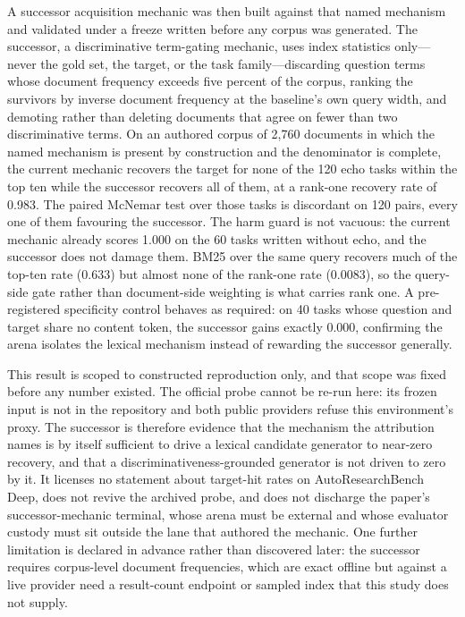 A successor acquisition mechanic was then built against that named mechanism and
validated under a freeze written before any corpus was generated.  The
successor, a discriminative term-gating mechanic, uses index statistics only---never the
gold set, the target, or the task family---discarding question terms whose
document frequency exceeds five percent of the corpus, ranking the survivors by
inverse document frequency at the baseline's own query width, and demoting rather
than deleting documents that agree on fewer than two discriminative terms.  On an
authored corpus of 2,760 documents in which the named mechanism is present by
construction and the denominator is complete, the current mechanic recovers the
target for none of the 120 echo tasks within the top ten while the successor
recovers all of them, at a rank-one recovery rate of 0.983.  The paired McNemar
test over those tasks is discordant on 120 pairs, every one of them favouring
the successor.  The harm guard is
not vacuous: the current mechanic already scores 1.000 on the 60 tasks written
without echo, and the successor does not damage them.  BM25 over the same query
recovers much of the top-ten rate (0.633) but almost none of the rank-one rate
(0.0083), so the
query-side gate rather than document-side weighting is what carries rank one.  A
pre-registered specificity control behaves as required: on 40 tasks whose
question and target share no content token, the successor gains exactly 0.000,
confirming the arena isolates the lexical mechanism instead of rewarding the
successor generally.

This result is scoped to constructed reproduction only, and that scope was
fixed before any number existed.  The official probe cannot be re-run here: its
frozen input is not in the repository and both public providers refuse this
environment's proxy.  The successor is therefore evidence that the mechanism the
attribution names is by itself sufficient to drive a lexical candidate generator
to near-zero recovery, and that a discriminativeness-grounded generator is not
driven to zero by it.  It licenses no statement about target-hit rates on
AutoResearchBench Deep, does not revive the archived probe, and does not
discharge the paper's successor-mechanic terminal, whose arena must be external
and whose evaluator custody must sit outside the lane that authored the
mechanic.  One further limitation is declared in advance rather than discovered
later: the successor requires corpus-level document frequencies, which are exact
offline but against a live provider need a result-count endpoint or sampled
index that this study does not supply.

